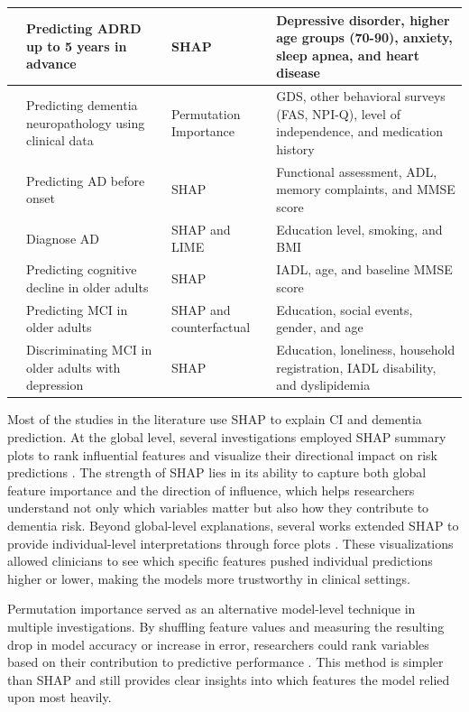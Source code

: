 \begin{longtable}{|M{0.15\textwidth}|M{0.25\textwidth}|M{0.2\textwidth}|M{0.3\textwidth}|}
    \cite{Akter2025Using} & Predicting ADRD up to 5 years in advance & SHAP & Depressive disorder, higher age groups (70-90), anxiety, sleep apnea, and heart disease \\ \hline
    \cite{Ren2025Identifying} & Predicting dementia neuropathology using clinical data & Permutation Importance & GDS, other behavioral surveys (FAS, NPI-Q), level of independence, and medication history \\ \hline
    \cite{Hossain2025Optimizing} & Predicting AD before onset & SHAP & Functional assessment, ADL, memory complaints, and MMSE score \\ \hline
    \cite{Mahamud2025Enhancing} & Diagnose AD & SHAP and LIME & Education level, smoking, and BMI \\ \hline
    \cite{Ren2025Using} & Predicting cognitive decline in older adults & SHAP & IADL, age, and baseline MMSE score \\ \hline
    \cite{Song2025Machine} & Predicting MCI in older adults & SHAP and counterfactual & Education, social events, gender, and age \\ \hline
    \cite{Yao2025Machine} & Discriminating MCI in older adults with depression & SHAP & Education, loneliness, household registration, IADL disability, and dyslipidemia \\ \hline
\end{longtable}

Most of the studies in the literature use SHAP to explain CI and dementia prediction. At the global level, several investigations employed SHAP summary plots to rank influential features and visualize their directional impact on risk predictions \cite{Akter2025Using, Georgiev2024Predicting, Hossain2025Optimizing, Li2023Early, Oh2024Multivariable, Sharma2024Leveraging}. The strength of SHAP lies in its ability to capture both global feature importance and the direction of influence, which helps researchers understand not only which variables matter but also how they contribute to dementia risk. Beyond global-level explanations, several works extended SHAP to provide individual-level interpretations through force plots \cite{Beebe-Wang2021Efficient, Danso2021Developing, Mahamud2025Enhancing, Yue2023Explainable}. These visualizations allowed clinicians to see which specific features pushed individual predictions higher or lower, making the models more trustworthy in clinical settings.

Permutation importance served as an alternative model-level technique in multiple investigations. By shuffling feature values and measuring the resulting drop in model accuracy or increase in error, researchers could rank variables based on their contribution to predictive performance \cite{Li2023Machine, Ren2023Improving, Ren2025Identifying}. This method is simpler than SHAP and still provides clear insights into which features the model relied upon most heavily.

